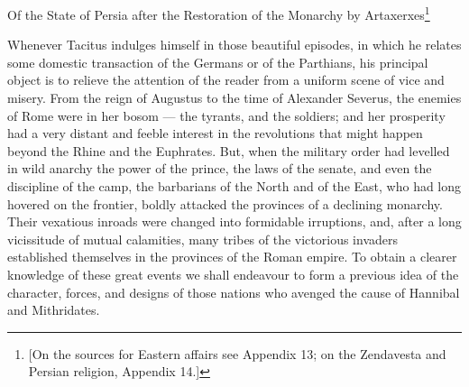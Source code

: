 Of the State of Persia after the Restoration of the Monarchy by Artaxerxes\footnote{[On the sources for Eastern affairs see Appendix 13; on the Zendavesta and Persian religion, Appendix 14.]}

Whenever Tacitus indulges himself in those beautiful episodes, in which he relates some domestic transaction of the Germans or of the Parthians, his principal object is to relieve the attention of the reader from a uniform scene of vice and misery. From the reign of Augustus to the time of Alexander Severus, the enemies of Rome were in her bosom \texthebrew{—} the tyrants, and the soldiers; and her prosperity had a very distant and feeble interest in the revolutions that might happen beyond the Rhine and the Euphrates. But, when the military order had levelled in wild anarchy the power of the prince, the laws of the senate, and even the discipline of the camp, the barbarians of the North and of the East, who had long hovered on the frontier, boldly attacked the provinces of a declining monarchy. Their vexatious inroads were changed into formidable irruptions, and, after a long vicissitude of mutual calamities, many tribes of the victorious invaders established themselves in the provinces of the Roman empire. To obtain a clearer knowledge of these great events we shall endeavour to form a previous idea of the character, forces, and designs of those nations who avenged the cause of Hannibal and Mithridates.

